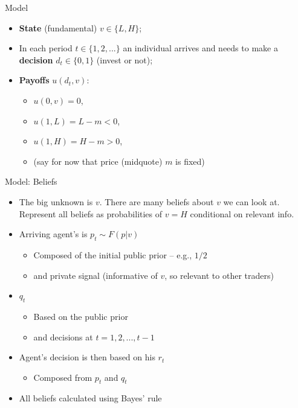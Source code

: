\documentclass[english,10pt
,aspectratio=169
]{beamer}
\begin{document}
\begin{frame}{Model}
	\begin{itemize}
		\item \textbf{State} (fundamental) $v \in \{L,H\}$;
		\item In each period $t \in \{1,2, ...\}$ an individual arrives and needs to make a \textbf{decision} $d_t \in \{0,1\}$ (invest or not);
		\item \textbf{Payoffs} $u(d_t,v)$:
		\begin{itemize}
			\item $u(0,v) = 0$,
			\item $u(1,L) = L-m < 0$,
			\item $u(1,H) = H-m > 0$,
			\item (say for now that price (midquote) $m$ is fixed)
		\end{itemize}
	\end{itemize}
\end{frame}


\begin{frame}{Model: Beliefs}
	\begin{itemize}
		\item The big unknown is $v$. There are many beliefs about $v$ we can look at. Represent all beliefs as probabilities of $v=H$ conditional on relevant info.
		\item Arriving agent's  is $p_t \sim F(p|v)$
		\begin{itemize}
			\item Composed of the initial public prior -- e.g., $1/2$
			\item and private signal (informative of $v$, so relevant to other traders)
		\end{itemize}
		\item {} $q_t$
		\begin{itemize}
			\item Based on the public prior
			\item and decisions at $t = 1,2,...,t-1$
		\end{itemize}
		\item Agent's decision is then based on his  $r_t$
		\begin{itemize}
			\item Composed from $p_t$ and $q_t$
		\end{itemize}
		\item All beliefs calculated using Bayes' rule
	\end{itemize}
\end{frame}
\end{document}
